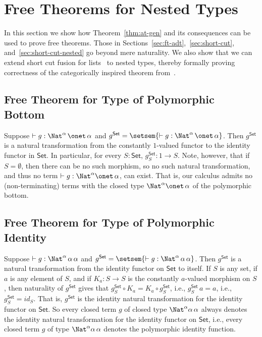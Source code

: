 \documentclass{lmcs}
\theoremstyle{plain}\newtheorem{satz}[thm]{Satz}
\newcommand{\set}{\mathsf{Set}}
\renewcommand{\id}{\mathit{id}}
\begin{document}
\section{Free Theorems for Nested Types}\label{sec:ftnt}

In this section we show how Theorem~\ref{thm:at-gen} and its
consequences can be used to prove free theorems. Those in
Sections~\ref{sec:ft-adt},~\ref{sec:short-cut},
and~\ref{sec:short-cut-nested} go beyond mere naturality.  We also
show that we can extend short cut fusion for lists~\cite{glp93} to
nested types, thereby formally proving correctness of the
categorically inspired theorem from~\cite{jg10}.

\subsection{Free Theorem for Type of Polymorphic
  Bottom}\label{sec:bottom} 

Suppose $ \vdash g : \Nat^\alpha \,\onet\,\alpha$ and $g^\set =
\setsem{\vdash g : \Nat^\alpha \,\onet\,\alpha}$. Then $g^\set$ is a
natural transformation from the constantly $1$-valued functor to the
identity functor in $\set$.  In particular, for every $S : \set$,
$g^\set_S : 1 \to S$. Note, however, that if $S = \emptyset$, then
there can be no such morphism, so no such natural transformation, and
thus no term $\vdash g : \Nat^\alpha \onet \,\alpha$, can exist.  That
is, our calculus admits no (non-terminating) terms with the closed
type $\Nat^\alpha \onet \,\alpha$ of the polymorphic bottom.

\subsection{Free Theorem for Type of Polymorphic
  Identity}\label{sec:identity} 

Suppose $ \vdash g : \Nat^\alpha \,\alpha\,\alpha$ and $g^\set =
\setsem{\vdash g : \Nat^\alpha \,\alpha\,\alpha}$.  Then $g^\set$ is a
natural transformation from the identity functor on $\set$ to
itself. If $S$ is any set, if $a$ is any element of $S$, and if $K_a
:S \to S$ is the constantly $a$-valued morphism on $S$, then
naturality of $g^\set$ gives that $g^\set_S \circ K_a = K_a \circ
g^\set_S$, i.e., $g^\set_S \, a = a$, i.e., $g^\set_S = \id_S$.  That
is, $g^\set$ is the identity natural transformation for the identity
functor on $\set$. So every closed term $g$ of closed type
$\Nat^\alpha\alpha\,\alpha$ always denotes the identity natural
transformation for the identity functor on $\set$, i.e., every closed
term $g$ of type $\Nat^\alpha\alpha\,\alpha$ denotes the polymorphic
identity function.
\end{document}
